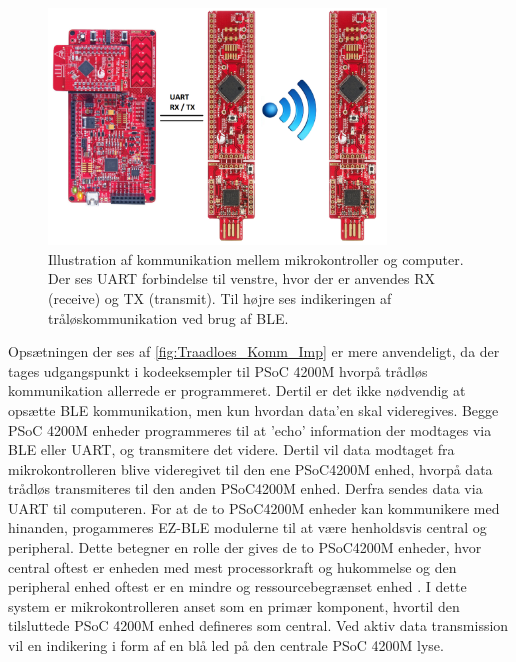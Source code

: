\begin{figure}[H]
	\centering
	\includegraphics[width=0.8\textwidth]{figures/Traadloes_Komm_Imp}
	\caption{Illustration af kommunikation mellem mikrokontroller og computer. Der ses UART forbindelse til venstre, hvor der er anvendes RX (receive) og TX (transmit). Til højre ses indikeringen af tråløskommunikation ved brug af BLE.} 
	\label{fig:Traadloes_Komm_Imp}
\end{figure}

Opsætningen der ses af \autoref{fig:Traadloes_Komm_Imp} er mere anvendeligt, da der tages udgangspunkt i kodeeksempler til PSoC 4200M hvorpå trådløs kommunikation allerrede er programmeret. Dertil er det ikke nødvendig at opsætte BLE kommunikation, men kun hvordan data'en skal videregives. 
Begge PSoC 4200M enheder programmeres til at 'echo' information der modtages via BLE eller UART, og transmitere det videre. Dertil vil data modtaget fra mikrokontrolleren blive videregivet til den ene PSoC4200M enhed, hvorpå data trådløs transmiteres til den anden PSoC4200M enhed. Derfra sendes data via UART til computeren. 
For at de to PSoC4200M enheder kan kommunikere med hinanden, progammeres EZ-BLE modulerne til at være henholdsvis central og peripheral. Dette betegner en rolle der gives de to PSoC4200M enheder, hvor central oftest er enheden med mest processorkraft og hukommelse og den peripheral enhed oftest er en mindre og ressourcebegrænset enhed \citep{townsend2014}. I dette system er mikrokontrolleren anset som en primær komponent, hvortil den tilsluttede PSoC 4200M enhed defineres som central. Ved aktiv data transmission vil en indikering i form af en blå led på den centrale PSoC 4200M lyse.